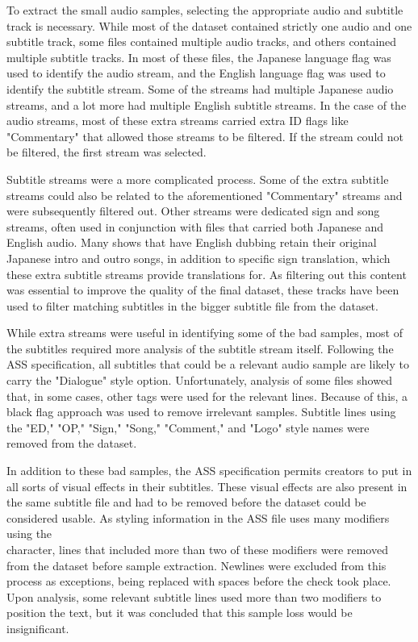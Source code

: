 To extract the small audio samples, selecting the appropriate audio and subtitle track is necessary.
While most of the dataset contained strictly one audio and one subtitle track, some files contained multiple audio tracks, and others contained multiple subtitle tracks.
In most of these files, the Japanese language flag was used to identify the audio stream, and the English language flag was used to identify the subtitle stream.
Some of the streams had multiple Japanese audio streams, and a lot more had multiple English subtitle streams.
In the case of the audio streams, most of these extra streams carried extra ID flags like "Commentary" that allowed those streams to be filtered.
If the stream could not be filtered, the first stream was selected.

Subtitle streams were a more complicated process.
Some of the extra subtitle streams could also be related to the aforementioned "Commentary" streams and were subsequently filtered out.
Other streams were dedicated sign and song streams, often used in conjunction with files that carried both Japanese and English audio.
Many shows that have English dubbing retain their original Japanese intro and outro songs, in addition to specific sign translation, which these extra subtitle streams provide translations for.
As filtering out this content was essential to improve the quality of the final dataset, these tracks have been used to filter matching subtitles in the bigger subtitle file from the dataset.


While extra streams were useful in identifying some of the bad samples, most of the subtitles required more analysis of the subtitle stream itself.
Following the ASS specification, all subtitles that could be a relevant audio sample are likely to carry the "Dialogue" style option.
Unfortunately, analysis of some files showed that, in some cases, other tags were used for the relevant lines.
Because of this, a black flag approach was used to remove irrelevant samples.
Subtitle lines using the "ED," "OP," "Sign," "Song," "Comment," and "Logo" style names were removed from the dataset.

In addition to these bad samples, the ASS specification permits creators to put in all sorts of visual effects in their subtitles. 
These visual effects are also present in the same subtitle file and had to be removed before the dataset could be considered usable.
As styling information in the ASS file uses many modifiers using the \\ character, lines that included more than two of these modifiers were removed from the dataset before sample extraction.
Newlines were excluded from this process as exceptions, being replaced with spaces before the check took place.
Upon analysis, some relevant subtitle lines used more than two modifiers to position the text, but it was concluded that this sample loss would be insignificant.

